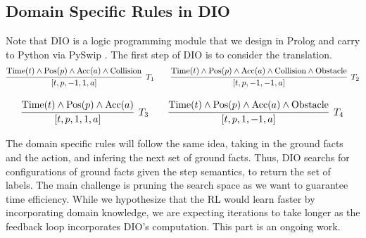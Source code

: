 \documentclass[a4paper,11pt]{article}
\begin{document}
\subsection{Domain Specific Rules in DIO}
Note that DIO is a logic programming module that we design in Prolog and 
carry to Python via PySwip \cite{tekol2020}.
The first step of DIO is to consider the translation. 
\[
  \infer[T_1]{[t, p, -1, 1, a]}{\text{Time}(t) \wedge \text{Pos}(p) 
                                \wedge \text{Acc}(a) \wedge
                              \text{Collision}}
   \qquad
   \infer[T_2]{[t, p, -1, -1, a]}{\text{Time}(t) \wedge \text{Pos}(p) 
                                  \wedge \text{Acc}(a) \wedge
                                  \text{Collision} \wedge \text{Obstacle}}
\]

\[
  \infer[T_3]{[t, p, 1, 1, a]}{\text{Time}(t) \wedge \text{Pos}(p) 
                                \wedge \text{Acc}(a)
                            }
   \qquad
   \infer[T_4]{[t, p, 1, -1, a]}{\text{Time}(t) \wedge \text{Pos}(p) 
                                  \wedge \text{Acc}(a) \wedge \text{Obstacle}}
\]

The domain specific rules will follow the same idea, taking in the ground facts and the action, 
and infering the next set of ground facts. Thus, DIO searchs for configurations of ground facts given the step semantics, 
to return the set of labels. The main challenge is pruning the search space as we want to 
guarantee time efficiency. While we hypothesize that the RL would learn faster by incorporating 
domain knowledge, we are expecting iterations to take longer as the feedback loop incorporates DIO's computation. This part is an ongoing work. 
\end{document}
